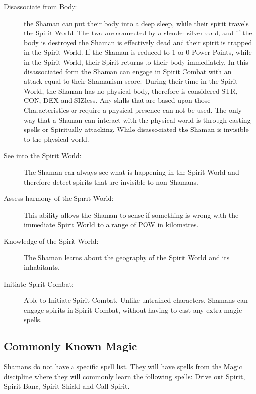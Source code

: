 \begin{description}
\item[Disassociate from Body:] the Shaman can put their body into a deep sleep, while their spirit travels the Spirit World. The two are connected by a slender silver cord, and if the body is destroyed the Shaman is effectively dead and their spirit is trapped in the Spirit World. If the Shaman is reduced to 1 or 0 Power Points, while in the Spirit World, their Spirit returns to their body immediately. In this disassociated form the Shaman can engage in Spirit Combat with an attack equal to their Shamanism score. During their time in the Spirit World, the Shaman has no physical body, therefore is considered STR, CON, DEX and SIZless. Any skills that are based upon those Characteristics or require a physical presence can not be used. The only way that a Shaman can interact with the physical world is through casting spells or Spiritually attacking. While disassociated the Shaman is invisible to the physical world.

\item[See into the Spirit World:] The Shaman can always see what is happening in the Spirit World and therefore detect spirits that are invisible to non-Shamans.

\item[Assess harmony of the Spirit World:] This ability allows the Shaman to sense if something is wrong with the immediate Spirit World to a range of POW in kilometres. 

\item[Knowledge of the Spirit World:] The Shaman learns about the geography of the Spirit World and its inhabitants.

\item[Initiate Spirit Combat:] Able to Initiate Spirit Combat. Unlike untrained characters, Shamans can engage spirits in Spirit Combat, without having to cast any extra magic spells.
\end{description}


\subsection{Commonly Known Magic}
Shamans do not have a specific spell list. They will have spells from the Magic discipline where they will commonly learn the following spells: Drive out Spirit, Spirit Bane, Spirit Shield and Call Spirit.


